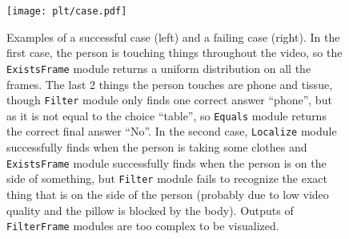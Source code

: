 \documentclass[letterpaper]{article} %
\begin{document}
\begin{figure}[t]
    \texttt{[image: plt/case.pdf]}
    \caption{Examples of a successful case (left) and a failing case (right). In the first case, the person is touching things throughout the video, so the \texttt{ExistsFrame} module returns a uniform distribution on all the frames. The last 2 things the person touches are phone and tissue, though \texttt{Filter} module only finds one correct answer ``phone'', but as it is not equal to the choice ``table'', so \texttt{Equals} module returns the correct final answer ``No''. In the second case, \texttt{Localize} module successfully finds when the person is taking some clothes and \texttt{ExistsFrame} module successfully finds when the person is on the side of something, but \texttt{Filter} module fails to recognize the exact thing that is on the side of the person (probably due to low video quality and the pillow is blocked by the body). Outputs of \texttt{FilterFrame} modules are too complex to be visualized.}
    \label{fig:case}
\end{figure}
\end{document}
